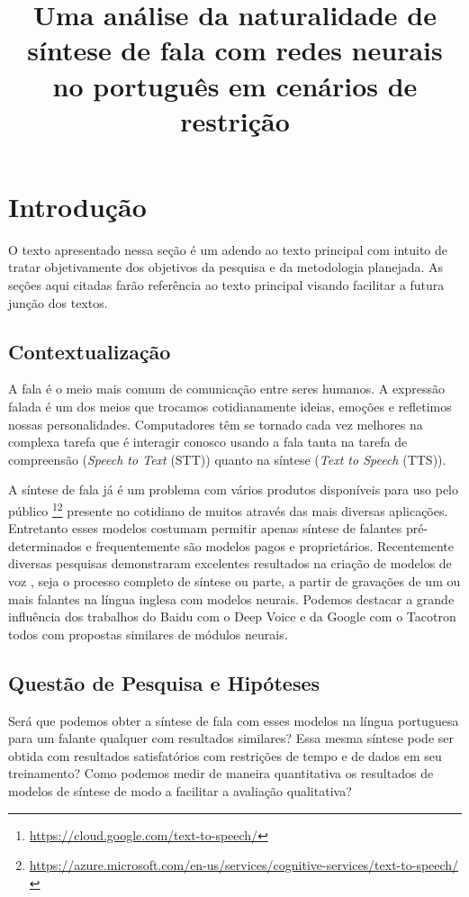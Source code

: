 \documentclass{article}
\begin{document}
\title{Uma análise da naturalidade de síntese de fala com redes neurais no português em cenários de restrição}

\maketitle

\section{Introdução}
O texto apresentado nessa seção é um adendo ao texto principal com intuito de tratar objetivamente dos objetivos da pesquisa e da metodologia planejada. As seções aqui citadas farão referência ao texto principal visando facilitar a futura junção dos textos.
\subsection{Contextualização}
A fala é o meio mais comum de comunicação entre seres humanos\cite{flanang}. 
A expressão falada é um dos meios que trocamos cotidianamente ideias, emoções e refletimos nossas personalidades\cite{Tiwari2012}. 
Computadores têm se tornado cada vez melhores na complexa tarefa que é interagir conosco usando a fala \cite{HCI-voice} tanta na tarefa de compreensão (\emph{Speech to Text} (STT)) quanto na síntese (\emph{Text to Speech} (TTS)). 

A síntese de fala já é um problema com vários produtos disponíveis para uso pelo público \footnote{\url{https://cloud.google.com/text-to-speech/}}\footnote{\url{https://azure.microsoft.com/en-us/services/cognitive-services/text-to-speech/}} presente no cotidiano de muitos através das mais diversas aplicações.
Entretanto esses modelos costumam permitir apenas síntese de falantes pré-determinados e frequentemente são modelos pagos e proprietários. 
Recentemente diversas pesquisas demonstraram excelentes resultados na criação de modelos de voz , seja o processo completo de síntese ou parte, a partir de gravações de um ou mais falantes na língua inglesa com modelos neurais.
Podemos destacar a grande influência dos trabalhos do Baidu com o Deep Voice\cite{deepVoice,deepVoice2,deepvoice3, baiduVoiceClonning} e da Google com o Tacotron \cite{tacotron,tacotron2, wavenet} todos com propostas similares de módulos neurais.

\subsection{Questão de Pesquisa e Hipóteses}
\label{sec:hipoteses}
Será que podemos obter a síntese de fala com esses modelos na língua portuguesa para um falante qualquer com resultados similares?
Essa mesma síntese pode ser obtida com resultados satisfatórios com restrições de tempo e de dados em seu treinamento?
Como podemos medir de maneira quantitativa os resultados de modelos de síntese de modo a facilitar a avaliação qualitativa?
\end{document}
